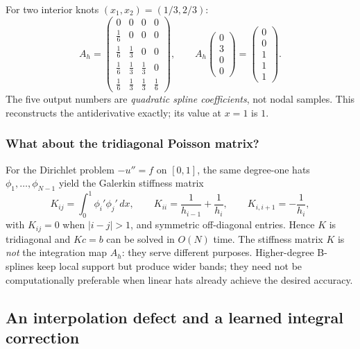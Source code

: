 For two interior knots $(x_1,x_2)=(1/3,2/3)$:
\begin{equation}
  A_h=
  \begin{pmatrix}
    0       & 0       & 0       & 0       \\
    \frac16 & 0       & 0       & 0       \\
    \frac16 & \frac13 & 0       & 0       \\
    \frac16 & \frac13 & \frac13 & 0       \\
    \frac16 & \frac13 & \frac13 & \frac16
  \end{pmatrix},\qquad
  A_h\begin{pmatrix}0\\3\\0\\0\end{pmatrix}
  =\begin{pmatrix}0\\0\\1\\1\\1\end{pmatrix}.
  \label{eq:scho-prefix-example}
\end{equation}
The five output numbers are \emph{quadratic spline
  coefficients}, not nodal samples. This reconstructs the
antiderivative exactly; its value at $x=1$ is $1$.

\subsubsection{What about the tridiagonal Poisson matrix?}

For the Dirichlet problem $-u''=f$ on $[0,1]$, the
same degree-one hats $\phi_1,\ldots,\phi_{N-1}$ yield
the Galerkin stiffness matrix
\begin{equation}
  K_{ij}=\int_0^1\phi_i'\phi_j'\,dx,\qquad
  K_{ii}=\frac1{h_{i-1}}+\frac1{h_i},\qquad
  K_{i,i+1}=-\frac1{h_i},
  \label{eq:scho-p1-stiffness}
\end{equation}
with $K_{ij}=0$ when $|i-j|>1$, and symmetric
off-diagonal entries. Hence $K$ is tridiagonal and
$Kc=b$ can be solved in $O(N)$ time. The stiffness
matrix $K$ is \emph{not} the integration map $A_h$:
they serve different purposes. Higher-degree B-splines
keep local support but produce wider bands; they need
not be computationally preferable when linear hats
already achieve the desired accuracy.


\subsection{An interpolation defect and a learned integral correction}
\label{sec:scho-interpolation-defect}

